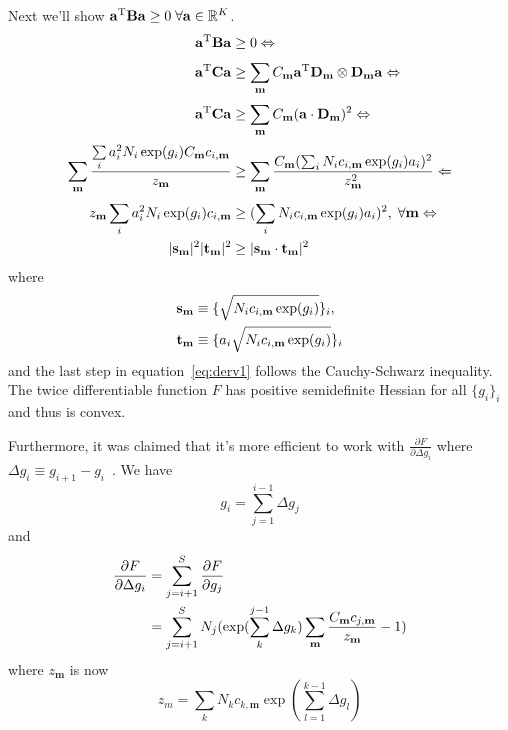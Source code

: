 Next we'll show $\mathbf{a}^{\mathrm{T}} \mathbf{B} \mathbf{a} \ge 0\;\forall \mathbf{a} \in \mathbb{R}^{K}$.
\begin{align}
\mathbf{a}^{\mathrm{T}} \mathbf{B} \mathbf{a} &\ge 0 \Leftrightarrow \notag \\
\mathbf{a}^{\mathrm{T}} \mathbf{C} \mathbf{a} &\ge \sum_{\mathbf{m}}^{} C_{\mathbf{m}}  \mathbf{a}^{\mathrm{T}} \mathbf{D}_{\mathbf{m}} \otimes \mathbf{D}_{\mathbf{m}} \mathbf{a}  \Leftrightarrow \notag \\
\mathbf{a}^{\mathrm{T}} \mathbf{C} \mathbf{a} &\ge \sum_{\mathbf{m}}^{} C_{\mathbf{m}} (\mathbf{a} \cdot \mathbf{D}_{\mathbf{m}})^2 \Leftrightarrow \notag \\
\sum_{\mathbf{m}}^{} \frac{\sum\limits_{i}^{} a_{i}^{2} N_{i} \exp(g_{i}) C_{\mathbf{m}} c_{i,\mathbf{m}}}{z_{\mathbf{m}}} &\ge  
\sum_{\mathbf{m}}^{} \frac{C_{\mathbf{m}}(\sum_{i}^{} N_{i} c_{i,\mathbf{m}} \exp(g_{i}) a_{i})^{2}}{z_{\mathbf{m}}^{2}} \Leftarrow \notag \\
z_{\mathbf{m}} \sum\limits_{i}^{} a_{i}^{2} N_{i} \exp(g_{i}) c_{i,\mathbf{m}} &\ge  
(\sum_{i}^{} N_{i} c_{i,\mathbf{m}} \exp(g_{i}) a_{i})^{2}, \;\forall \mathbf{m} \Leftrightarrow \notag \\
\lvert\mathbf{\mathbf{s}_{\mathbf{m}}}\rvert^{2} \lvert\mathbf{\mathbf{t}_{\mathbf{m}}}\rvert^{2} &\ge \lvert\mathbf{\mathbf{s}_{\mathbf{m}} \cdot \mathbf{t}_{\mathbf{m}}}\rvert^{2}  
\label{eq:derv1}
\end{align}
where
\begin{align}
\mathbf{s}_{\mathbf{m}} &\equiv \{\sqrt{N_{i} c_{i,\mathbf{m}} \exp(g_{i})}\}_{i}, \notag \\
\mathbf{t}_{\mathbf{m}} &\equiv \{a_{i} \sqrt{N_{i} c_{i,\mathbf{m}} \exp(g_{i})}\}_{i}
\label{eq:derv2}
\end{align}
and the last step in equation~\ref{eq:derv1} follows the Cauchy-Schwarz inequality.  
The twice differentiable function $F$ has positive semidefinite Hessian for all $\{g_{i}\}_{i}$ 
and thus is convex.

Furthermore, it was claimed that it's more efficient to work with $\frac{\partial F}{\partial \Delta g_{i}}$ 
where $\Delta g_{i} \equiv g_{i+1}-g_{i}$~\cite{Zhu2012}. We have 
\begin{equation}
g_{i} = \sum_{j=1}^{i-1} \Delta g_{j} 
\label{eq:gidgj}
\end{equation}
and 
\begin{align}
\frac{\partial F}{\partial \Delta g_{i}} &= \sum_{j=i+1}^{S} \frac{\partial F}{\partial g_{j}} \notag \\
&= \sum_{j=i+1}^{S} N_{j} (\exp(\sum_{k}^{j-1} \Delta g_{k}) \sum_{\mathbf{m}}^{} \frac{C_{\mathbf{m}} c_{j,\mathbf{m}}}{z_{\mathbf{m}}} - 1) 
\label{eq:dfddgj}
\end{align}
where $z_{\mathbf{m}}$ is now
\begin{equation}
z_{m} = \sum_{k}^{} N_{k} c_{k,\mathbf{m}} \exp(\sum_{l=1}^{k-1} \Delta g_{l})
\label{eq:zdgj}
\end{equation}
